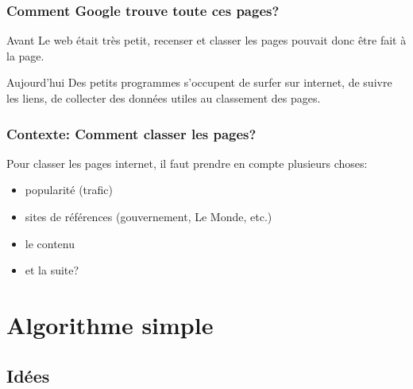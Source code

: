 \documentclass{beamer}
\begin{document}
\begin{frame}
  \frametitle{Comment Google trouve toute ces pages?}

  
  \begin{block}{Avant}
    Le web était très petit, recenser et classer les pages pouvait
    donc être fait à la page.
  \end{block}
  
  \pause

  \begin{block}{Aujourd'hui}
    Des petits programmes s'occupent de surfer sur internet, de suivre
    les liens, de collecter des données utiles au classement des
    pages.
  \end{block}


\end{frame}


\begin{frame}
  \frametitle{Contexte: Comment classer les pages?}
  
  Pour classer les pages internet, il faut prendre en compte plusieurs
  choses:\\
  
  \begin{itemize}
    \item popularité (trafic)
      \pause
    \item sites de références (gouvernement, Le Monde, etc.)
      \pause
    \item le contenu
      \pause
    \item et la suite?
  \end{itemize}

\end{frame}

\section{Algorithme simple}
\subsection{Idées}


\begin{frame}
  \tableofcontents[currentsection,subsectionstyle=hide]
\end{frame}
\end{document}

